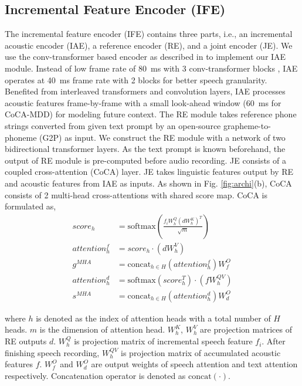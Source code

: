 \documentclass[a4paper]{article}
\begin{document}
\subsection{Incremental Feature Encoder (IFE)}
The incremental feature encoder (IFE) contains three parts, i.e., 
an incremental acoustic encoder (IAE), a reference encoder (RE), and a joint encoder (JE). We use the conv-transformer based encoder as described in \cite{Huang2020ConvTransformerTL} to implement our IAE module. Instead of low frame rate of 80~ms with 3 conv-transformer blocks \cite{Huang2020ConvTransformerTL}, IAE operates at 40~ms frame rate with 2 blocks for better speech granularity. Benefited from interleaved transformers and convolution layers, IAE processes acoustic features frame-by-frame with a small look-ahead window (60~ms for CoCA-MDD) for modeling future context. The RE module takes reference phone strings converted from given text prompt by an open-source grapheme-to-phoneme (G2P) \cite{g2pe} as input. We construct the RE module with a network of two bidirectional transformer layers. As the text prompt is known beforehand, the output of RE module is pre-computed before audio recording.
JE consists of a coupled cross-attention (CoCA) layer. JE takes 
linguistic features output by RE and acoustic features from IAE as inputs. 
As shown in Fig. \ref{fig:archi}(b), CoCA consists of 2 multi-head cross-attentions with shared score map. CoCA is formulated as,
\begin{align}
    score_h &= \text{softmax}(\frac{f_i W_{h}^{Q}(d W_{h}^{K})^T}{\sqrt{m}}) \label{eqn:score} \\
    attention_h^{f} &= score_h \cdot (d W_{h}^{V}) \label{eqn:attnh} \\
    g^{MHA} &= \text{concat}_{h\in H}(attention_h^f)W_f^O \label{eqn:attnh2} \\
    attention_h^{d} &= \text{softmax}(score_h^{T}) \cdot (f W_{h}^{QV}) \label{eqn:attns} \\
    s^{MHA} &= \text{concat}_{h\in H}(attention_h^d)W_d^O \label{eqn:attns2}
\end{align}

\noindent where $h$ is denoted as the index of attention heads with a total number of $H$ heads. $m$ is the dimension of attention head. $W_{h}^{K}$, $W_{h}^{V}$ are projection matrices of RE outputs $d$. $W_{h}^{Q}$ is projection matrix of incremental speech feature $f_i$. 
After finishing speech recording, $W_{h}^{QV}$ is projection matrix of accumulated acoustic features $f$. $W_{f}^{O}$ and $W_{d}^{O}$ are output weights of speech attention and text attention respectively.
Concatenation operator is denoted as $\text{concat}(\cdot)$.
\end{document}
